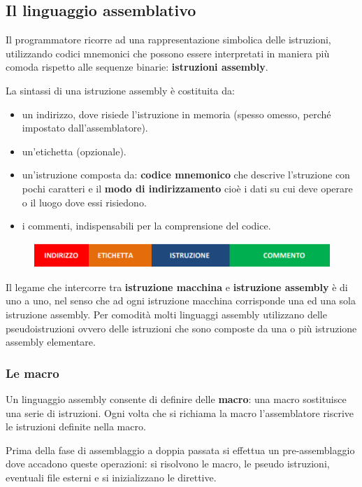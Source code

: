\documentclass[12pt]{article} %
\begin{document}
\subsection{Il linguaggio assemblativo}
Il programmatore ricorre ad una rappresentazione simbolica delle istruzioni, utilizzando codici mnemonici che possono essere interpretati in maniera più comoda rispetto alle sequenze binarie: \textbf{istruzioni assembly}.
\par\maketitle\noindent
La sintassi di una istruzione assembly è costituita da:
\begin{itemize}
    \item un indirizzo, dove risiede l’istruzione in memoria (spesso omesso, perché impostato dall’assemblatore).
    \item un'etichetta (opzionale).
    \item un'istruzione composta da: \textbf{codice mnemonico} che descrive l'struzione con pochi caratteri e il \textbf{modo di indirizzamento} cioè i dati su cui deve operare o il luogo dove essi risiedono.
    \item i commenti, indispensabili per la comprensione del codice.
\end{itemize}
\begin{figure}[h]
    \centering
    \includegraphics[width=0.75\linewidth]{istruszione.png}
    \label{fig:enter-label}
\end{figure}
\par\maketitle\noindent 
Il legame che intercorre tra \textbf{istruzione macchina} e \textbf{istruzione assembly} è di uno a uno, nel senso che ad ogni istruzione macchina corrisponde una ed una sola istruzione assembly. Per comodità molti linguaggi assembly utilizzano delle pseudoistruzioni ovvero delle istruzioni che sono composte da una o più istruzione assembly elementare.
\subsubsection{Le macro}
Un linguaggio assembly consente di definire delle \textbf{macro}: una macro sostituisce una serie di istruzioni. Ogni volta che si richiama la macro l’assemblatore riscrive le istruzioni definite nella macro.\par\medskip\noindent
Prima della fase di assemblaggio a doppia passata si effettua un pre-assemblaggio dove accadono queste operazioni: si risolvono le macro, le pseudo istruzioni, eventuali file esterni e si inizializzano le direttive.
\end{document}
